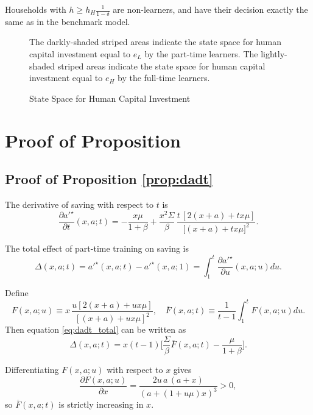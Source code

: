 \documentclass[12pt]{article}
\begin{document}
Households with $h \geq h_H\frac{1}{1-\delta}$ are non-learners, and have their decision exactly the same as in the benchmark model.


\begin{figure}
    \centering
    

\caption{State Space for Human Capital Investment}
\begin{flushleft}
\footnotesize{The darkly-shaded striped areas indicate the state space for human capital investment equal to $e_L$ by the part-time learners. The lightly-shaded striped areas indicate the state space for human capital investment equal to $e_H$ by the full-time learners.} 
\end{flushleft}
    
\label{fig:e-digram_yequalz}
\end{figure}

\section{Proof of Proposition} \label{appsec: proofs}
\subsection{Proof of Proposition \ref{prop:dadt}}
The derivative of saving with respect to $t$ is
\begin{equation}
\frac{\partial a'^\star}{\partial t}(x,a;t)
=
-\frac{x\mu}{1+\beta}
+
\frac{x^2 \Sigma}{\beta}\,
\frac{t\,[2(x+a) + t x \mu]}{\big[(x+a) + t x \mu\big]^2}.
\label{eq:dadlambda_partial}
\end{equation}

The total effect of part-time training on saving is
\begin{equation}
    \Delta(x,a;t) = a'^\star(x,a;t) - a'^\star(x,a;1) = \int_1^t \frac{\partial a'^\star}{\partial u}(x,a;u) du. \label{eq:dadt_total}
\end{equation}

Define
\[
F(x,a;u)\equiv x\,\frac{u[2(x+a)+u x \mu]}{[(x+a)+u x \mu]^2}, \quad \overline{F}(x,a;t)\equiv \frac{1}{t-1}\int_1^t F(x,a;u) du.
\]
Then equation \eqref{eq:dadt_total} can be written as
\[
    \Delta(x,a;t)
= x(t-1)\Big[\frac{\Sigma}{\beta}\overline{F}(x,a;t)-\frac{\mu}{1+\beta}\Big].
\]

Differentiating $F(x,a;u)$ with respect to $x$ gives
\[
\frac{\partial F(x,a;u)}{\partial x}
=
\frac{2u\,a\,(a+x)}{(a+ (1+u\mu) x)^3}
>0,
\]
so $\overline{F}(x,a;t)$ is strictly increasing in $x$.
\end{document}
